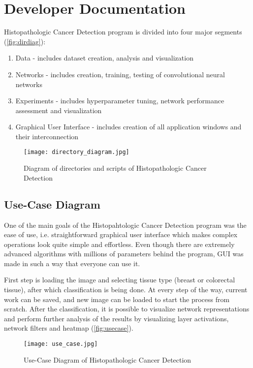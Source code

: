 \chapter{Developer Documentation} %
\label{ch:impl}

Histopathologic Cancer Detection program is divided into four major segments (\textcolor{red}{\autoref{fig:dirdiag}}):
\begin{enumerate}
	\itemsep 0em
	\item Data - includes dataset creation, analysis and visualization
	\item Networks - includes creation, training, testing of convolutional neural networks
	\item Experiments - includes hyperparameter tuning, network performance assessment and visualization
	\item Graphical User Interface - includes creation of all application windows and their interconnection
\end{enumerate}

\begin{figure}[h]
	\centering
	\texttt{[image: directory\_diagram.jpg]}
	\caption{Diagram of directories and scripts of Histopathologic Cancer Detection}
	\label{fig:dirdiag}
\end{figure}

\section{Use-Case Diagram}

One of the main goals of the Histopahtologic Cancer Detection program was the ease of use, i.e. straightforward graphical user interface which makes complex operations look quite simple and effortless. Even though there are extremely advanced algorithms with millions of parameters behind the program, GUI was made in such a way that everyone can use it. 

First step is loading the image and selecting tissue type (breast or colorectal tissue), after which classification is being done. At every step of the way, current work can be saved, and new image can be loaded to start the process from scratch. After the classification, it is possible to visualize network representations and perform further analysis of the results by visualizing layer activations, network filters and heatmap (\textcolor{red}{\autoref{fig:usecase}}).

\begin{figure}[h]
	\centering
	\texttt{[image: use\_case.jpg]}
	\caption{Use-Case Diagram of Histopathologic Cancer Detection}
	\label{fig:usecase}
\end{figure}

